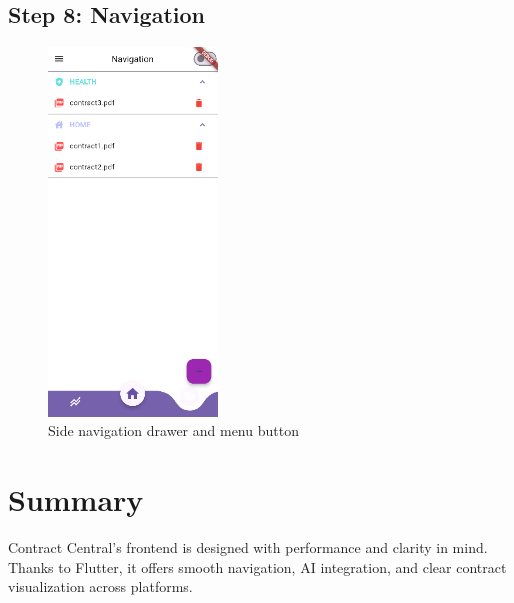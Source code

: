 \subsection*{Step 8: Navigation}

\begin{figure}[H]
    \centering
    \includegraphics[width=0.4\textwidth]{frontend/navigation_menu.png}
    \caption{Side navigation drawer and menu button}
\end{figure}

\section*{Summary}

Contract Central's frontend is designed with performance and clarity in mind. Thanks to Flutter, it offers smooth navigation, AI integration, and clear contract visualization across platforms.
